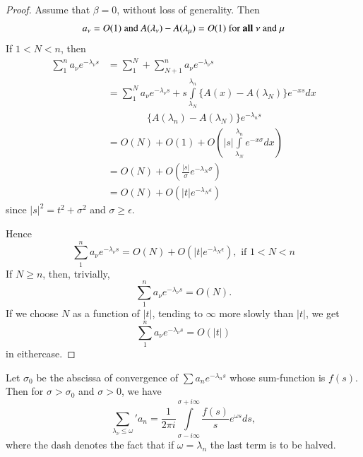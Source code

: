 \begin{proof}
Assume that $\beta =0$, without loss of generality. Then 
$$
a_\nu = O(1) \text{ and } A(\lambda_\nu) - A(\lambda_\mu) = O(1)
\text{ for {\bf all} } \nu \text{ and } \mu
$$
If $1< N < n$, then
\begin{align*}
\sum\limits^n_1 a_\nu e^{-\lambda_\nu s} & = \sum^N_1 + \sum^n_{N+1}
a_\nu e^{-\lambda_\nu s}\\
& = \sum^N_1 a_\nu e^{-\lambda_\nu s} + s
\int\limits^{\lambda_n}_{\lambda_N} \{A(x) - A (\lambda_N)\} e^{-xs}
dx\\
&\qquad\qquad \{A(\lambda_n) - A (\lambda_N)\}e^{-\lambda_ns}\\
& = O(N) + O(1) + O\left(|s|
\int\limits^{\lambda_n}_{\lambda_N}e^{-x\sigma}  dx
\right)\\
& = O(N) + O \left(\frac{|s|}{\sigma} e^{-\lambda_N \sigma}  \right)\\
& = O(N) + O \left(|t| e^{-\lambda_N\epsilon} \right)
\end{align*}\pageoriginale 
since $|s|^2 = t^2 + \sigma^2$ and $\sigma \geq \epsilon$.

Hence
$$
\sum\limits^n_1 a_\nu e^{-\lambda_\nu s} = O(N) + O (|t|
e^{-\lambda_N\epsilon}) , \text{ if } 1 < N < n
$$
If $N \geq n$, then, trivially, 
$$
\sum\limits^n_1 a_\nu e^{-\lambda_\nu s} = O (N).
$$
If we choose $N$ as a function of $|t|$, tending to $\infty$ more
slowly than $|t|$, we get
$$
\sum\limits^n_1 a_\nu e^{-\lambda_\nu s} = O (|t|)
$$
in either\pageoriginale case.
\end{proof}

\begin{theorem*}
Let $\sigma_0$ be the abscissa of convergence of $\sum a_n
e^{-\lambda_n s}$ whose sum-function is $f(s)$. Then for $\sigma >
\sigma_0$ and $\sigma>0$, we have 
$$
{\sum\limits_{\lambda_\nu \leq \omega}}' a_n = \frac{1}{2\pi i}
\int\limits^{\sigma + i \infty}_{\sigma - i \infty} \frac{f(s)}{s}
e^{\omega s} ds , 
$$
where the dash denotes the fact that if $\omega = \lambda_n$ the last
term is to be halved.
\end{theorem*}



